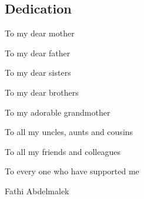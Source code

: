 \newenvironment{dedication}
{
	\thispagestyle{empty}
	\vspace*{\stretch{1}}
	\itshape
	\raggedleft
}
{\par
	\vspace{\stretch{3}}
	\clearpage
}
\begin{center}
	\section*{Dedication}
\end{center}
\begin{dedication}
	To my dear mother
	
	To my dear father
	
	To my dear sisters
	
	To my dear brothers
	
	To my adorable grandmother
	
	To all my uncles, aunts and cousins
	
	To all my friends and colleagues
	
	To every one who have supported me
	\par
	\vspace{2\baselineskip}
	
	\vspace{\baselineskip}
	Fathi Abdelmalek
\end{dedication}